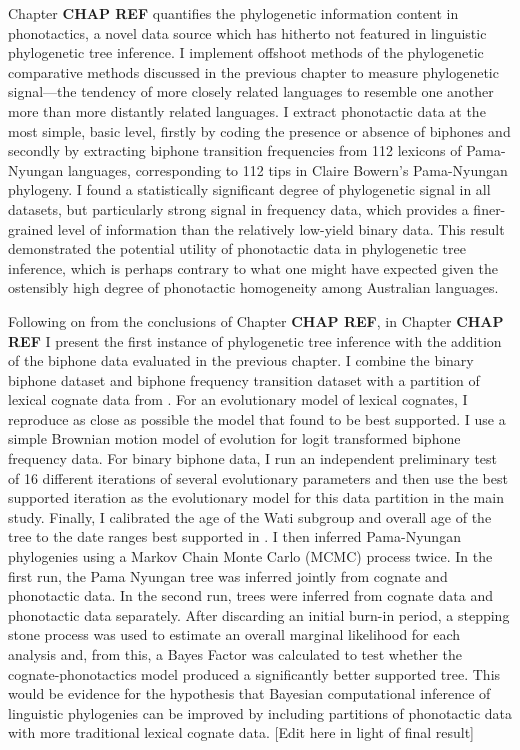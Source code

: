 Chapter \textbf{CHAP REF} quantifies the phylogenetic information content in phonotactics, a novel data source which has hitherto not featured in linguistic phylogenetic tree inference. I implement offshoot methods of the phylogenetic comparative methods discussed in the previous chapter to measure phylogenetic signal---the tendency of more closely related languages to resemble one another more than more distantly related languages. I extract phonotactic data at the most simple, basic level, firstly by coding the presence or absence of biphones and secondly by extracting biphone transition frequencies from 112 lexicons of Pama-Nyungan languages, corresponding to 112 tips in Claire Bowern's Pama-Nyungan phylogeny. I found a statistically significant degree of phylogenetic signal in all datasets, but particularly strong signal in frequency data, which provides a finer-grained level of information than the relatively low-yield binary data. This result demonstrated the potential utility of phonotactic data in phylogenetic tree inference, which is perhaps contrary to what one might have expected given the ostensibly high degree of phonotactic homogeneity among Australian languages.

Following on from the conclusions of Chapter \textbf{CHAP REF}, in Chapter \textbf{CHAP REF} I present the first instance of phylogenetic tree inference with the addition of the biphone data evaluated in the previous chapter. I combine the binary biphone dataset and biphone frequency transition dataset with a partition of lexical cognate data from \textcite{bouckaert_origin_2018}. For an evolutionary model of lexical cognates, I reproduce as close as possible the model that \textcite{bouckaert_origin_2018} found to be best supported. I use a simple Brownian motion model of evolution for logit transformed biphone frequency data. For binary biphone data, I run an independent preliminary test of 16 different iterations of several evolutionary parameters and then use the best supported iteration as the evolutionary model for this data partition in the main study. Finally, I calibrated the age of the Wati subgroup and overall age of the tree to the date ranges best supported in \textcite{bouckaert_origin_2018}. I then inferred Pama-Nyungan phylogenies using a Markov Chain Monte Carlo (MCMC) process twice. In the first run, the Pama Nyungan tree was inferred jointly from cognate and phonotactic data. In the second run, trees were inferred from cognate data and phonotactic data separately. After discarding an initial burn-in period, a stepping stone process \autocite{baele_accurate_2013} was used to estimate an overall marginal likelihood for each analysis and, from this, a Bayes Factor was calculated to test whether the cognate-phonotactics model produced a significantly better supported tree. This would be evidence for the hypothesis that Bayesian computational inference of linguistic phylogenies can be improved by including partitions of phonotactic data with more traditional lexical cognate data. {[}Edit here in light of final result{]}

